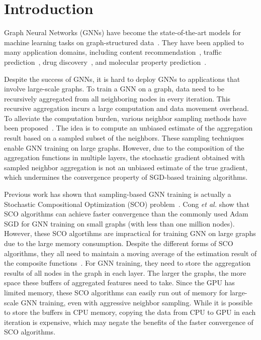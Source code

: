 \section{Introduction}
Graph Neural Networks (GNNs) have become the state-of-the-art models for machine learning tasks on graph-structured data~\cite{kipf2017semi, duran2017learning, zhang2017weisfeiler, zhang2018link, ying2018hierarchical, gilmer2017neural}. 
They have been applied to many application domains, including content recommendation~\cite{ying2018graph}, traffic prediction~\cite{zhang2018gaan},  drug discovery~\cite{li2018learning}, and molecular property prediction~\cite{gilmer2017neural}.  

Despite the success of GNNs, it is hard to deploy GNNs to applications that involve large-scale graphs. 
To train a GNN on a graph, data need to be recursively aggregated from all neighboring nodes in every iteration. 
This recursive aggregation incurs a large computation and data movement overhead. 
To alleviate the computation burden, various neighbor sampling methods have been proposed~\cite{hamilton2017inductive, ying2018graph, chen2018fastgcn, zou2019layer, AAAI1816642, chiang2019cluster, Zeng2020GraphSAINT}. 
The idea is to compute an unbiased estimate of the aggregation result based on a sampled subset of the neighbors. 
These sampling techniques enable GNN training on large graphs. 
However, 
due to the composition of the aggregation functions in multiple layers, 
the stochastic gradient obtained with sampled neighbor aggregation is not an unbiased estimate of the true gradient, which undermines the convergence property of SGD-based training algorithms. 

Previous work has shown that sampling-based GNN training is actually a Stochastic Compositional Optimization (SCO) problem~\cite{cong2020minimal, jiang2021communicationefficient, cong2021importance}. 
Cong {\em et al.} show that SCO algorithms can achieve faster convergence than the commonly used Adam SGD for GNN training on small graphs (with less than one million nodes). 
However, these SCO algortihms are impractical for training GNN on large graphs due to the large memory consumption. 
Despite the different forms of SCO algorithms, they all need to maintain a moving average of the estimation result of the composite functions~\cite{yang2019multilevel, balasubramanian2020stochastic, chen2020solving, lian2017finite, wang2017accelerating, ghadimi2020single}. 
For GNN training, they need to store the aggregation results of all nodes in the graph in each layer. 
The larger the graphs, the more space these buffers of aggregated features need to take. 
Since the GPU has limited memory, these SCO algorithms can easily run out of memory for large-scale GNN training, even with aggressive neighbor sampling. 
While it is possible to store the buffers in CPU memory, copying the data from CPU to GPU in each iteration is expensive, which may negate the benefits of the faster convergence of SCO algorithms. 


